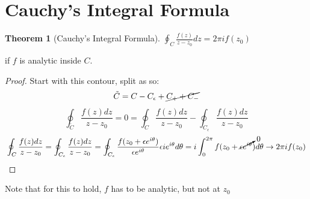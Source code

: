 \documentclass[11pt,notitlepage]{article}
\newtheorem{thm}{Theorem}[section]
\begin{document}
\section{Cauchy's Integral Formula}
\begin{thm}[Cauchy's Integral Formula]
$\oint_C \frac{f(z)}{z-z_0} dz = 2\pi i f(z_0)$ 
\end{thm}
\begin{flushright}
if $f$ is analytic inside $C$.
\end{flushright}
\begin{proof}

Start with this contour, split as so:
$$\tilde C = C - C_\epsilon +\cancel{C_{+} + C_{-}}$$
$$\oint_{\tilde C} \frac{f(z) dz}{z-z_0} 
= 0 
=\oint_{ C} \frac{f(z) dz}{z-z_0} -\oint_{C_\epsilon} \frac{f(z) dz}{z-z_0}$$
$$\oint_{C} \frac{f(z) dz}{z-z_0} 
= \oint_{C_\epsilon} \frac{f(z) dz}{z-z_0}
= \oint_{C_\epsilon} \frac{f(z_0 + \epsilon e^{i\theta}) }{\epsilon e^{i\theta}} \epsilon i e^{i\theta} d\theta 
= i \int_0^{2\pi} f(z_0 + \cancelto{0}{\epsilon e^{i\theta}}) d\theta \rightarrow 2\pi i f(z_0) $$
\end{proof}
Note that for this to hold, $f$ has to be analytic, but not at $z_0$
\end{document}
